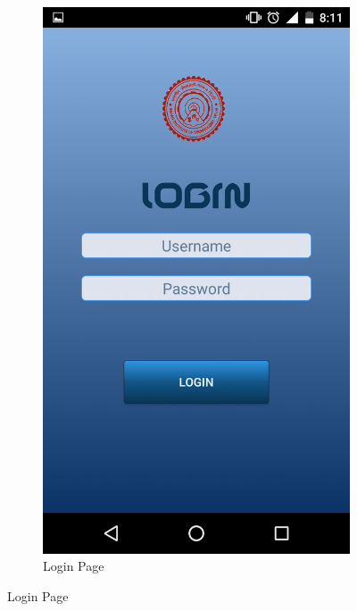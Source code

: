 \documentclass{article}
\begin{document}
\begin{figure}[H]
\begin{subfigure}{.4\textwidth}
          \includegraphics[width=0.9\linewidth]{loginui.png}
          \caption{Login Page}
          \label{fig:sub2}
      \end{subfigure}
      \label{figstart}
    \end{figure}
\end{document}
